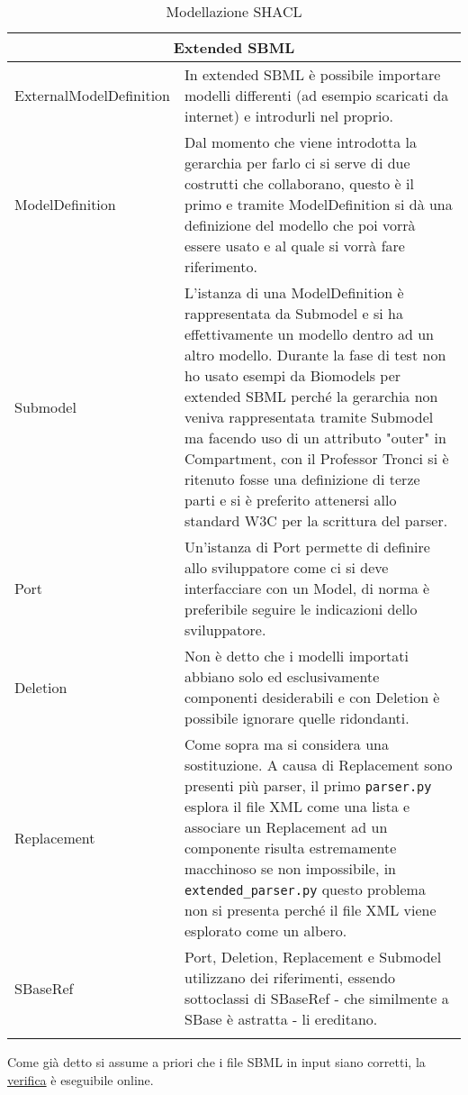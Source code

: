 \documentclass{article}
\begin{document}
\begin{longtable}{p{}p{}}
    \hline 
    \multicolumn{2}{c}{Extended SBML} \\
    \hline
    ExternalModelDefinition & In extended SBML è possibile importare modelli differenti (ad esempio scaricati da internet) e introdurli nel proprio. \\
    \hline
    ModelDefinition & Dal momento che viene introdotta la gerarchia per farlo ci si serve di due costrutti che collaborano, questo è il primo e tramite ModelDefinition si dà una definizione del modello che poi vorrà essere usato e al quale si vorrà fare riferimento. \\
    \hline
    Submodel & L'istanza di una ModelDefinition è rappresentata da Submodel e si ha effettivamente un modello dentro ad un altro modello. Durante la fase di test non ho usato esempi da Biomodels per extended SBML perché la gerarchia non veniva rappresentata tramite Submodel ma facendo uso di un attributo "outer" in Compartment, con il Professor Tronci si è ritenuto fosse una definizione di terze parti e si è preferito attenersi allo standard W3C per la scrittura del parser. \\ 
    \hline
    Port & Un'istanza di Port permette di definire allo sviluppatore come ci si deve interfacciare con un Model, di norma è preferibile seguire le indicazioni dello sviluppatore. \\ 
    \hline
    Deletion & Non è detto che i modelli importati abbiano solo ed esclusivamente componenti desiderabili e con Deletion è possibile ignorare quelle ridondanti. \\
    \hline
    Replacement & Come sopra ma si considera una sostituzione. A causa di Replacement sono presenti più parser, il primo \texttt{parser.py} esplora il file XML come una lista e associare un Replacement ad un componente risulta estremamente macchinoso se non impossibile, in \texttt{extended\_parser.py} questo problema non si presenta perché il file XML viene esplorato come un albero. \\
    \hline
    SBaseRef & Port, Deletion, Replacement e Submodel utilizzano dei riferimenti, essendo sottoclassi di SBaseRef - che similmente a SBase è astratta - li ereditano. \\
    \hline

    \caption{Modellazione SHACL}
    \label{tab:modellazione}
\end{longtable}

Come già detto si assume a priori che i file SBML in input siano corretti, la \href{http://sbml.org/Facilities/Validator}{verifica} è eseguibile online.
\end{document}
